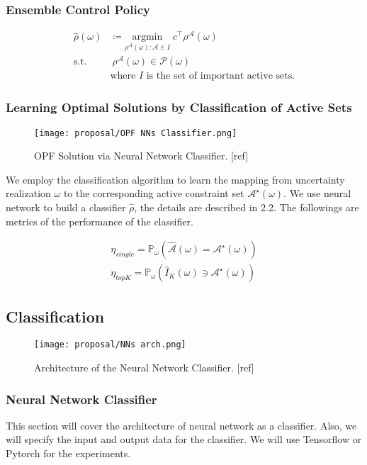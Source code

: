 \documentclass[11pt]{article}
\begin{document}
\subsubsection{Ensemble Control Policy}
\begin{align}\label{eq:opf_predict}
\hat{\rho}\left(\omega\right) & \coloneqq \underset{\rho^{\mathcal{A}}\left(\omega\right):\mathcal{A}\in I}{\mathrm{argmin}} \; c^{\top}\rho^{\mathcal{A}}\left(\omega\right) \\
\textrm{s.t.} 
~ &~ \rho^{\mathcal{A}}\left(\omega\right) \in \mathcal{P}\left(\omega\right) \nonumber \\
& \text{where } I \text{ is the set of important active sets.} \nonumber
\end{align}

\subsubsection{Learning Optimal Solutions by Classification of Active Sets}
\begin{figure}[h]\label{fig:opf_nns}
\centering
\texttt{[image: proposal/OPF NNs Classifier.png]}
\caption{OPF Solution via Neural Network Classifier. [ref]}
\end{figure}
We employ the classification algorithm to learn the mapping from uncertainty realization $\omega$ to the corresponding active constraint set $\mathcal{A}^{\star}\left( \omega \right)$. We use neural network to build a classifier $\hat{\rho}$, the details are described in 2.2. The followings are metrics of the performance of the classifier.

\begin{align}\label{eq:acc}
\eta_{single} = \mathbb{P}_{\omega}\left(\hat{\mathcal{A}} \left(\omega \right)=\mathcal{A}^{\star}\left(\omega \right) \right) \\
\eta_{topK} = \mathbb{P}_{\omega}\left(\hat{I}_{K} \left(\omega \right) \ni \mathcal{A}^{\star}\left(\omega \right) \right)
\end{align}

\subsection{Classification}
\begin{figure}[h]\label{fig:nns_arch}
\centering
\texttt{[image: proposal/NNs arch.png]}
\caption{Architecture of the Neural Network Classifier. [ref]}
\end{figure}
\subsubsection{Neural Network Classifier}
This section will cover the architecture of neural network as a classifier. Also, we will specify the input and output data for the classifier. We will use Tensorflow or Pytorch for the experiments. 
\end{document}
